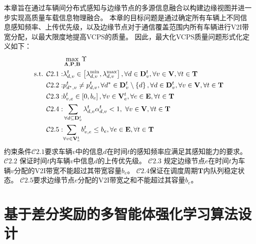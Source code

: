 本章旨在通过车辆间分布式感知与边缘节点的多源信息融合以构建边缘视图并进一步实现高质量车载信息物理融合。
本章的目标问题是通过确定所有车辆上不同信息感知频率、上传优先级，以及边缘节点对于通信覆盖范围内所有车辆进行V2I带宽分配，以最大限度地提高VCPS的质量。
因此，最大化VCPS质量问题形式化定义如下：
\begin{align}
	&\max_{\bf\Lambda, \mathbf{P}, \mathbf{B}} \Upsilon \notag \\
	\text { s.t. }
    \mathcal{C}2.1: & \lambda_{d,v}^{t} \in \left [\lambda_{d,v}^{\min} , \lambda_{d,v}^{\max} \right ], \forall d \in \mathbf{D}_v^t , \forall v \in \mathbf{V}, \forall t \in \mathbf{T} \notag \\
     \mathcal{C}2.2: &{p}_{d^*, v}^t \neq {p}_{d, v}^t, \forall d^* \in \mathbf{D}_v^t \setminus \left\{ d\right \}, \forall d \in \mathbf{D}_v^t, \forall v \in \mathbf{V}, \forall t \in \mathbf{T} \notag \\
    \mathcal{C}2.3: & b_{v, e}^t \in \left[ 0 , b_e \right ], \forall v \in \mathbf{V}_e^t, \forall e \in \mathbf{E}, \forall t \in \mathbf{T} \notag \\
    \mathcal{C}2.4: & \sum_{\forall d \subseteq \mathbf{D}_v^t} \lambda_{d,v}^{t}  \alpha_{d, v}^t < 1,\ \forall v \in \mathbf{V}, \forall t \in \mathbf{T}  \notag \\
    \mathcal{C}2.5: & {\sum_{\forall v \in \mathbf{V}_e^{t}}b_{v, e}^t} \leq b_e, \forall e \in \mathbf{E}, \forall t \in \mathbf{T}
\end{align}
约束条件$\mathcal{C}2.1$要求车辆$v$中的信息$d$在时间$t$的感知频率应满足其感知能力的要求。
$\mathcal{C}2.2$ 保证时间$t$内车辆$v$中信息$d$的上传优先级。
$\mathcal{C}2.3$ 规定边缘节点$e$在时间$t$为车辆$v$分配的V2I带宽不能超过其带宽容量$b_e$。
$\mathcal{C}2.4$保证在调度周期$\mathbf{T}$内队列稳定状态。
$\mathcal{C}2.5$要求边缘节点$e$分配的V2I带宽之和不能超过其容量$b_e$。

\section{基于差分奖励的多智能体强化学习算法设计}\label{section 2-5}

